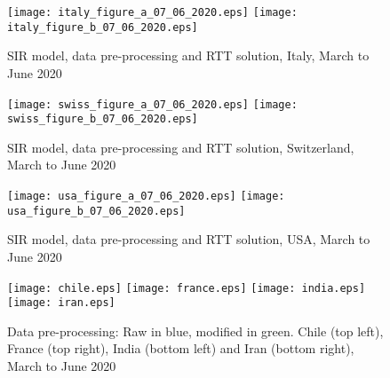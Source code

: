 \documentclass{article}
\begin{document}
\begin{figure}
\begin{center}
{\texttt{[image: italy\_figure\_a\_07\_06\_2020.eps]}}
\qquad
{\texttt{[image: italy\_figure\_b\_07\_06\_2020.eps]}}
\end{center}
\begin{center}
\caption{SIR model, data pre-processing and RTT solution, Italy, March to June 2020
}
\label{fig:italy_sir_model_07_06_2020}
\end{center}
\end{figure}

\begin{figure}
\begin{center}
{\texttt{[image: swiss\_figure\_a\_07\_06\_2020.eps]}}
\qquad
{\texttt{[image: swiss\_figure\_b\_07\_06\_2020.eps]}}
\end{center}
\begin{center}
\caption{SIR model, data pre-processing and RTT solution, Switzerland, March to June 2020
}
\label{fig:swiss_sir_model_07_06_2020}
\end{center}
\end{figure}

\begin{figure}
\begin{center}
{\texttt{[image: usa\_figure\_a\_07\_06\_2020.eps]}}
\qquad
{\texttt{[image: usa\_figure\_b\_07\_06\_2020.eps]}}
\end{center}
\begin{center}
\caption{SIR model, data pre-processing and RTT solution, USA, March to June 2020
}
\label{fig:usa_sir_model_07_06_2020}
\end{center}
\end{figure}



\begin{figure}[H]
\begin{center}
{\texttt{[image: chile.eps]}}
\qquad
{\texttt{[image: france.eps]}}
\qquad
{\texttt{[image: india.eps]}}
\qquad
{\texttt{[image: iran.eps]}}
\end{center}
\begin{center}
\caption{Data pre-processing: Raw in blue, modified in green. Chile (top left), France (top right), India (bottom left) and Iran (bottom right), March to June 2020
}
\label{fig:chile_france_india_iran_07_06_2020}
\end{center}
\end{figure}
\end{document}
